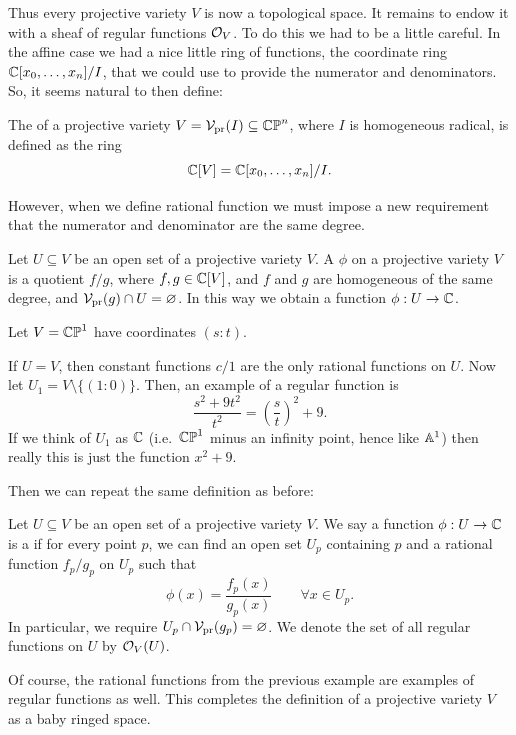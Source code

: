 Thus every projective variety $V$ is now a topological space.
It remains to endow it with a sheaf of regular functions $\mathcal O_V$.
To do this we had to be a little careful.
In the affine case we had a nice little ring of functions,
the coordinate ring $\mathbb C[x_0,\dots,x_n] / I$,
that we could use to provide the numerator and denominators.
So, it seems natural to then define:
\begin{definition}
	The  of a projective variety
	$V = \mathcal V_{\text{pr}}(I) \subseteq \mathbb{CP}^n$, where $I$ is homogeneous radical,
	is defined as the ring
	\[ \mathbb C[V] = \mathbb C[x_0, \dots, x_n] / I. \]
\end{definition}
However, when we define rational function we must impose
a new requirement that the numerator and denominator are the same degree.
\begin{definition}
	Let $U \subseteq V$ be an open set of a projective variety $V$.
	A  $\phi$ on a projective variety $V$
	is a quotient $f/g$, where $f,g \in \mathbb C[V]$,
	and $f$ and $g$ are homogeneous of the same degree,
	and $\mathcal V_{\text{pr}}(g) \cap U = \varnothing$.
	In this way we obtain a function $\phi : U \to \mathbb C$.
\end{definition}
\begin{example}
	Let $V = \mathbb{CP}^1$ have coordinates $(s:t)$.
	\begin{enumerate}[(a)]
		\ii If $U = V$, then constant functions $c/1$
		are the only rational functions on $U$.
		\ii Now let $U_1 = V \setminus \{(1:0)\}$.
		Then, an example of a regular function is
		\[ \frac{s^2+9t^2}{t^2} = \left( \frac st \right)^2 + 9. \]
		If we think of $U_1$ as $\mathbb C$
		(i.e.\ $\mathbb{CP}^1$ minus an infinity point, hence like $\mathbb A^1$)
		then really this is just the function $x^2+9$.
	\end{enumerate}
\end{example}
Then we can repeat the same definition as before:
\begin{definition}
	Let $U \subseteq V$ be an open set of a projective variety $V$.
	We say a function $\phi : U \to \mathbb C$ is a  if
	for every point $p$, we can find an open set $U_p$ containing $p$
	and a rational function $f_p/g_p$ on $U_p$ such that
	\[ \phi(x) = \frac{f_p(x)}{g_p(x)} \qquad \forall x \in U_p. \]
	In particular, we require $U_p \cap \mathcal V_{\text{pr}}(g_p) = \varnothing$.
	We denote the set of all regular functions on $U$ by $\mathcal O_V(U)$.
\end{definition}
Of course, the rational functions from the previous example
are examples of regular functions as well.
This completes the definition of a projective variety $V$
as a baby ringed space.

